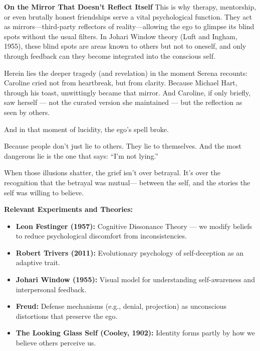 \begin{PsychologicalSidebar}{\textbf{On the Mirror That Doesn't Reflect Itself}}
  This is why therapy, mentorship, or even brutally honest friendships serve a vital psychological function. They act 
  as mirrors—third-party reflectors of reality—allowing the ego to glimpse its blind spots without the usual filters. 
  In Johari Window theory (Luft and Ingham, 1955), these blind spots are areas known to others but not to oneself, and 
  only through feedback can they become integrated into the conscious self.

\medskip
  
  Herein lies the deeper tragedy (and revelation) in the moment Serena recounts: Caroline cried not from heartbreak, 
  but from clarity. Because Michael Hart, through his toast, unwittingly became that mirror. And Caroline, if only 
  briefly, saw herself --- not the curated version she maintained --- but the reflection as seen by others.
  
\medskip
  
  And in that moment of lucidity, the ego’s spell broke.

\medskip
  
  Because people don’t just lie to others.
  They lie to themselves.
  And the most dangerous lie is the one that says: “I’m not lying.”

\medskip
  
  When those illusions shatter, the grief isn’t over betrayal.
  It’s over the recognition that the betrayal was mutual—
  between the self, and the stories the self was willing to believe.
  
  \vspace{1em}
  \noindent\textbf{Relevant Experiments and Theories:}
  \begin{itemize}
  \item \textbf{Leon Festinger (1957):} Cognitive Dissonance Theory — we modify beliefs to reduce psychological discomfort 
  from inconsistencies.
  \item \textbf{Robert Trivers (2011):} Evolutionary psychology of self-deception as an adaptive trait.
  \item \textbf{Johari Window (1955):} Visual model for understanding self-awareness and interpersonal feedback.
  \item \textbf{Freud:} Defense mechanisms (e.g., denial, projection) as unconscious distortions that preserve the ego.
  \item \textbf{The Looking Glass Self (Cooley, 1902):} Identity forms partly by how we believe others perceive us.
  \end{itemize}
\end{PsychologicalSidebar}

\medskip
